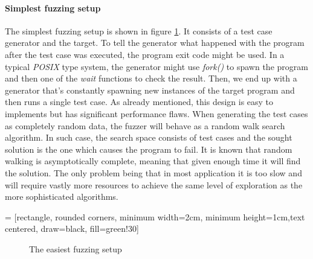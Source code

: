 \paragraph{Simplest fuzzing setup}
The simplest fuzzing setup is shown in figure \ref{fig:simp_fuzz}. It consists of a test case generator and the target. To tell the generator what happened with the program after the test case was executed, the program exit code might be used. In a typical \textit{POSIX} type system, the generator might use \textit{fork()} to spawn the program and then one of the \textit{wait} functions to check the result. Then, we end up with a generator that's constantly spawning new instances of the target program and then runs a single test case. As already mentioned, this design is easy to implements but has significant performance flaws. When generating the test cases as completely random data, the fuzzer will behave as a random walk search algorithm. In such case, the search space consists of test cases and the sought solution is the one which causes the program to fail. It is known that random walking is asymptotically complete, meaning that given enough time it will find the solution. The only problem being that in most application it is too slow and will require vastly more resources to achieve the same level of exploration as the more sophisticated algorithms.

 = [rectangle, rounded corners, minimum width=2cm, minimum height=1cm,text centered, draw=black, fill=green!30]

\begin{figure}[h!]
    \centering


    \caption{The easiest fuzzing setup}
    \label{fig:simp_fuzz}
\end{figure}


